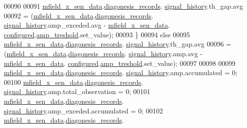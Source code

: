 \begin{DoxyCode}
00090 
00091                 \hyperlink{a00052_af8c531b1ba5fea148fb9111e06058f92}{mfield\_x\_sen\_data}.\hyperlink{a00025_a2bd79ce84bbd6b7f50d38954f7ae475e}{diagonesis\_records}.
      \hyperlink{a00019_ab7038f4de1f77b52a7f89e9f77c0b846}{signal\_history}.th\_gap.avg
00092                     = (\hyperlink{a00052_af8c531b1ba5fea148fb9111e06058f92}{mfield\_x\_sen\_data}.\hyperlink{a00025_a2bd79ce84bbd6b7f50d38954f7ae475e}{diagonesis\_records}.
      \hyperlink{a00019_ab7038f4de1f77b52a7f89e9f77c0b846}{signal\_history}.amp\_exceded.avg - \hyperlink{a00052_af8c531b1ba5fea148fb9111e06058f92}{mfield\_x\_sen\_data}.
      \hyperlink{a00025_a94b2d1f6ea4ab334c74d24984dd27843}{configured}.\hyperlink{a00021_a4b3bbfb0267daea1432f2603825ade62}{amp\_treshold}.set\_value);
00093             \}
00094             \textcolor{keywordflow}{else}
00095             \hyperlink{a00052_af8c531b1ba5fea148fb9111e06058f92}{mfield\_x\_sen\_data}.\hyperlink{a00025_a2bd79ce84bbd6b7f50d38954f7ae475e}{diagonesis\_records}.
      \hyperlink{a00019_ab7038f4de1f77b52a7f89e9f77c0b846}{signal\_history}.th\_gap.avg
00096                     = (\hyperlink{a00052_af8c531b1ba5fea148fb9111e06058f92}{mfield\_x\_sen\_data}.\hyperlink{a00025_a2bd79ce84bbd6b7f50d38954f7ae475e}{diagonesis\_records}.
      \hyperlink{a00019_ab7038f4de1f77b52a7f89e9f77c0b846}{signal\_history}.amp.avg - \hyperlink{a00052_af8c531b1ba5fea148fb9111e06058f92}{mfield\_x\_sen\_data}.
      \hyperlink{a00025_a94b2d1f6ea4ab334c74d24984dd27843}{configured}.\hyperlink{a00021_a4b3bbfb0267daea1432f2603825ade62}{amp\_treshold}.set\_value);
00097 
00098 
00099               \hyperlink{a00052_af8c531b1ba5fea148fb9111e06058f92}{mfield\_x\_sen\_data}.\hyperlink{a00025_a2bd79ce84bbd6b7f50d38954f7ae475e}{diagonesis\_records}.
      \hyperlink{a00019_ab7038f4de1f77b52a7f89e9f77c0b846}{signal\_history}.amp.accumulated                 = 0;
00100               \hyperlink{a00052_af8c531b1ba5fea148fb9111e06058f92}{mfield\_x\_sen\_data}.\hyperlink{a00025_a2bd79ce84bbd6b7f50d38954f7ae475e}{diagonesis\_records}.
      \hyperlink{a00019_ab7038f4de1f77b52a7f89e9f77c0b846}{signal\_history}.amp.total\_observation           = 0;
00101               \hyperlink{a00052_af8c531b1ba5fea148fb9111e06058f92}{mfield\_x\_sen\_data}.\hyperlink{a00025_a2bd79ce84bbd6b7f50d38954f7ae475e}{diagonesis\_records}.
      \hyperlink{a00019_ab7038f4de1f77b52a7f89e9f77c0b846}{signal\_history}.amp\_exceded.accumulated         = 0;
00102               \hyperlink{a00052_af8c531b1ba5fea148fb9111e06058f92}{mfield\_x\_sen\_data}.\hyperlink{a00025_a2bd79ce84bbd6b7f50d38954f7ae475e}{diagonesis\_records}.

\end{DoxyCode}
